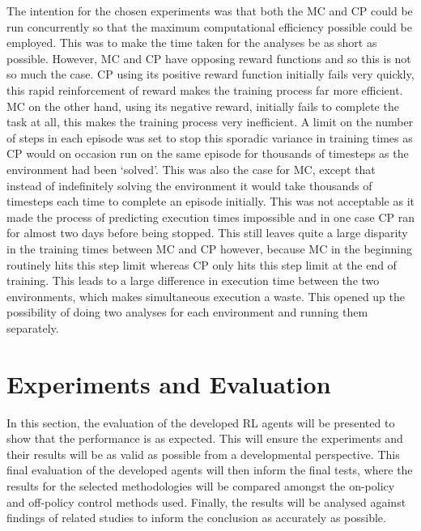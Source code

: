 \documentclass[hidelinks,journal]{IEEEtran}
\begin{document}
The intention for the chosen experiments was that both the MC and CP could be run concurrently so that the maximum computational efficiency possible could be employed. This was to make the time taken for the analyses be as short as possible. However, MC and CP have opposing reward functions and so this is not so much the case. CP using its positive reward function initially fails very quickly, this rapid reinforcement of reward makes the training process far more efficient. MC on the other hand, using its negative reward, initially fails to complete the task at all, this makes the training process very inefficient. A limit on the number of steps in each episode was set to stop this sporadic variance in training times as CP would on occasion run on the same episode for thousands of timesteps as the environment had been ‘solved’. This was also the case for MC, except that instead of indefinitely solving the environment it would take thousands of timesteps each time to complete an episode initially. This was not acceptable as it made the process of predicting execution times impossible and in one case CP ran for almost two days before being stopped. This still leaves quite a large disparity in the training times between MC and CP however, because MC in the beginning routinely hits this step limit whereas CP only hits this step limit at the end of training. This leads to a large difference in execution time between the two environments, which makes simultaneous execution a waste. This opened up the possibility of doing two analyses for each environment and running them separately.
\section{Experiments and Evaluation}
\label{sec:exp}
In this section, the evaluation of the developed RL agents will be presented to show that the performance is as expected. This will ensure the experiments and their results will be as valid as possible from a developmental perspective. This final evaluation of the developed agents will then inform the final tests, where the results for the selected methodologies will be compared amongst the on-policy and off-policy control methods used. Finally, the results will be analysed against findings of related studies to inform the conclusion as accurately as possible.
\end{document}
